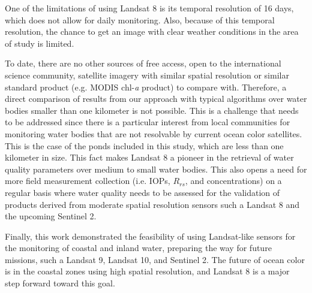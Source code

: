 One of the limitations of using Landsat 8 is its temporal resolution of 16 days, which does not allow for daily monitoring. Also, because of this temporal resolution, the chance to get an image with clear weather conditions in the area of study is limited.

To date, there are no other sources of free access, open to the international science community, satellite imagery with similar spatial resolution or similar standard product (e.g. MODIS chl-{\it a} product) to compare with. Therefore, a direct comparison of results from our approach with typical algorithms over water bodies smaller than one kilometer is not possible. This is a challenge that needs to be addressed since there is a particular interest from local communities for monitoring water bodies that are not resolvable by current ocean color satellites. This is the case of the ponds included in this study, which are less than one kilometer in size. This fact makes Landsat 8 a pioneer in the retrieval of water quality parameters over medium to small water bodies. This also opens a need for more field measurement collection (i.e. IOPs, $R_{rs}$, and concentrations) on a regular basis where water quality needs to be assessed for the validation of products derived from moderate spatial resolution sensors such a Landsat 8 and the upcoming Sentinel 2. 

Finally, this work demonstrated the feasibility of using Landsat-like sensors for the monitoring of coastal and inland water, preparing the way for future missions, such a Landsat 9, Landsat 10, and Sentinel 2. The future of ocean color is in the coastal zones using high spatial resolution, and Landsat 8 is a major step forward toward this goal.